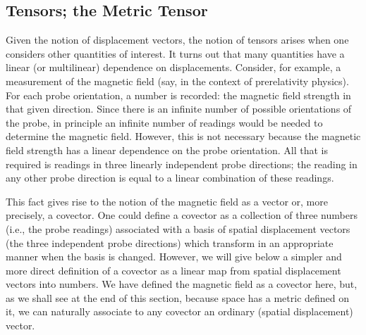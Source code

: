 
\subsection{Tensors; the Metric Tensor}\label{sec:2.3}

Given the notion of displacement vectors, the notion of tensors arises when one
considers other quantities of interest.  It turns out that many quantities have a
linear (or multilinear) dependence on displacements.  Consider, for example, a
measurement of the magnetic field (say, in the context of prerelativity physics).
For each probe orientation, a number is recorded: the magnetic field strength in
that given direction.  Since there is an infinite number of possible orientations of
the probe, in principle an infinite number of readings would be needed to determine
the magnetic field.  However, this is not necessary because the magnetic field
strength has a linear dependence on the probe orientation.  All that is required is
readings in three linearly independent probe directions; the reading in any other
probe direction is equal to a linear combination of these readings.

This fact gives rise to the notion of the magnetic field as a vector or, more
precisely, a covector.  One could define a covector as a collection of three numbers
(i.e., the probe readings) associated with a basis of spatial displacement vectors
(the three independent probe directions) which transform in an appropriate manner
when the basis is changed.  However, we will give below a simpler and more direct
definition of a covector as a linear map from spatial displacement vectors into
numbers.  We have defined the magnetic field as a covector here, but, as we shall
see at the end of this section, because space has a metric defined on it, we can
naturally associate to any covector an ordinary (spatial displacement) vector.

